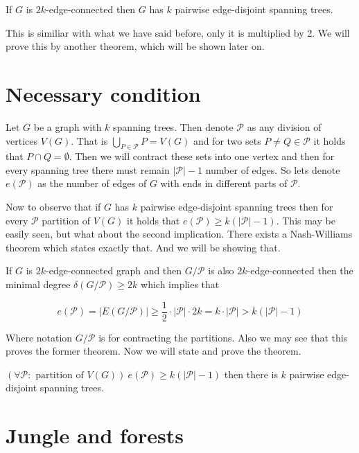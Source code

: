 \begin{thm}
	If $G$ is $2k$-edge-connected then $G$ has $k$ pairwise edge-disjoint spanning trees.
\end{thm}

This is similiar with what we have said before, only it is multiplied by 2. We will prove this by another theorem, which will be shown later on.

\section{Necessary condition}

Let $G$ be a graph with $k$ spanning trees. Then denote $\mathcal{P}$ as any division of vertices $V(G)$. That is $\bigcup_{P \in \mathcal{P}} P = V(G)$ and for two sets $P \neq Q \in \mathcal{P}$ it holds that $P \cap Q = \emptyset$. Then we will contract these sets into one vertex and then for every spanning tree there must remain $|\mathcal{P}| -1$ number of edges. So lets denote $e(\mathcal{P})$ as the number of edges of $G$ with ends in different parts of $\mathcal{P}$.

Now to observe that if $G$ has $k$ pairwise edge-disjoint spanning trees then for every $\mathcal{P}$ partition of $V(G)$ it holds that $e(\mathcal{P}) \geq k (|\mathcal{P}| - 1)$. This may be easily seen, but what about the second implication. There exists a Nash-Williams theorem which states exactly that. And we will be showing that.

\begin{observ}
	If $G$ is $2k$-edge-connected graph and then $G/\mathcal{P}$ is also $2k$-edge-connected then the minimal degree $\delta(G/\mathcal{P}) \geq 2k$ which implies that
	
	$$
	e(\mathcal{P}) = |E(G/\mathcal{P})| \geq \frac{1}{2} \cdot |\mathcal{P}| \cdot 2k = k \cdot |\mathcal{P}| > k (|\mathcal{P}| - 1)
	$$
\end{observ}

Where notation $G / \mathcal{P}$ is for contracting the partitions. Also we may see that this proves the former theorem. Now we will state and prove the theorem.

\begin{thm}
	$(\forall \mathcal{P} : \text{ partition of } V(G)) \ e(\mathcal{P}) \geq k (|\mathcal{P}| - 1)$ then there is $k$ pairwise edge-disjoint spanning trees.
\end{thm}

\section{Jungle and forests}

